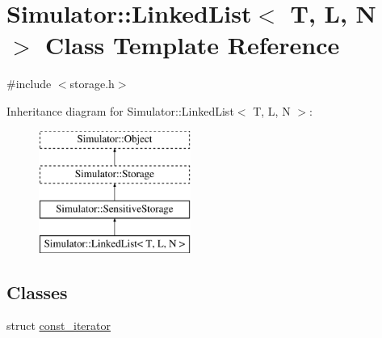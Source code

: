\hypertarget{class_simulator_1_1_linked_list}{\section{Simulator\+:\+:Linked\+List$<$ T, L, N $>$ Class Template Reference}
\label{class_simulator_1_1_linked_list}
}


{\ttfamily \#include $<$storage.\+h$>$}

Inheritance diagram for Simulator\+:\+:Linked\+List$<$ T, L, N $>$\+:\begin{figure}[H]
\begin{center}
\leavevmode
\includegraphics[height=4.000000cm]{class_simulator_1_1_linked_list}
\end{center}
\end{figure}
\subsection*{Classes}
\begin{DoxyCompactItemize}
\item 
struct \hyperlink{struct_simulator_1_1_linked_list_1_1const__iterator}{const\+\_\+iterator}
\end{DoxyCompactItemize}
